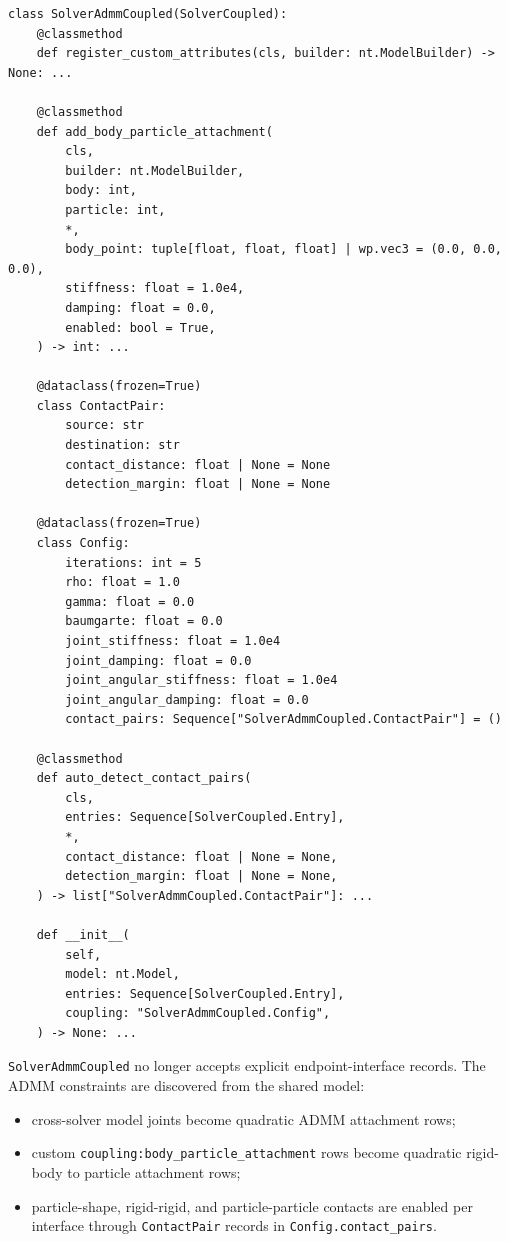 \documentclass[11pt]{article}
\begin{document}
\begin{verbatim}
class SolverAdmmCoupled(SolverCoupled):
    @classmethod
    def register_custom_attributes(cls, builder: nt.ModelBuilder) -> None: ...

    @classmethod
    def add_body_particle_attachment(
        cls,
        builder: nt.ModelBuilder,
        body: int,
        particle: int,
        *,
        body_point: tuple[float, float, float] | wp.vec3 = (0.0, 0.0, 0.0),
        stiffness: float = 1.0e4,
        damping: float = 0.0,
        enabled: bool = True,
    ) -> int: ...

    @dataclass(frozen=True)
    class ContactPair:
        source: str
        destination: str
        contact_distance: float | None = None
        detection_margin: float | None = None

    @dataclass(frozen=True)
    class Config:
        iterations: int = 5
        rho: float = 1.0
        gamma: float = 0.0
        baumgarte: float = 0.0
        joint_stiffness: float = 1.0e4
        joint_damping: float = 0.0
        joint_angular_stiffness: float = 1.0e4
        joint_angular_damping: float = 0.0
        contact_pairs: Sequence["SolverAdmmCoupled.ContactPair"] = ()

    @classmethod
    def auto_detect_contact_pairs(
        cls,
        entries: Sequence[SolverCoupled.Entry],
        *,
        contact_distance: float | None = None,
        detection_margin: float | None = None,
    ) -> list["SolverAdmmCoupled.ContactPair"]: ...

    def __init__(
        self,
        model: nt.Model,
        entries: Sequence[SolverCoupled.Entry],
        coupling: "SolverAdmmCoupled.Config",
    ) -> None: ...
\end{verbatim}

\texttt{SolverAdmmCoupled} no longer accepts explicit endpoint-interface
records. The ADMM constraints are discovered from the shared model:
\begin{itemize}
    \item cross-solver model joints become quadratic ADMM attachment rows;
    \item custom \texttt{coupling:body\_particle\_attachment} rows become
    quadratic rigid-body to particle attachment rows;
    \item particle-shape, rigid-rigid, and particle-particle contacts are
    enabled per interface through \texttt{ContactPair} records in
    \texttt{Config.contact\_pairs}.
\end{itemize}
\end{document}

